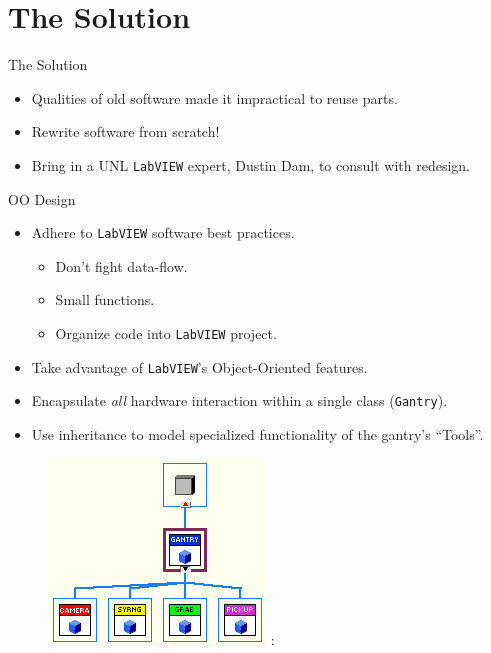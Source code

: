 \documentclass{beamer}
\begin{document}
\section{The Solution}

\begin{frame}{The Solution}
\begin{itemize}
    \item Qualities of old software made it impractical to reuse parts.
    \item Rewrite software from scratch!
    \item Bring in a UNL \texttt{LabVIEW} expert, Dustin Dam, to consult with redesign.
\end{itemize}
\end{frame}

\begin{frame}{OO Design}
\begin{itemize}
    \item Adhere to \texttt{LabVIEW} software best practices.
    \begin{itemize}
        \item Don't fight data-flow.
        \item Small functions.
        \item Organize code into \texttt{LabVIEW} project.
    \end{itemize}
    \item Take advantage of \texttt{LabVIEW}'s Object-Oriented features.
    \item Encapsulate \emph{all} hardware interaction within a single class (\texttt{Gantry}).
    \item Use inheritance to model specialized functionality of the gantry's ``Tools''.
\end{itemize}
\begin{figure}
    \centering
    \includegraphics[height=0.35\textheight]{"figures/Class Hierarchy"}
    \label{fig:class_hierarchy}:
\end{figure}
\end{frame}
\end{document}
